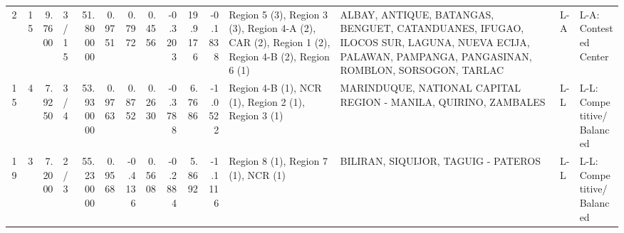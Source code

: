 \begin{tabular}{rrrlrrrrrrrllll}
2 & 15 & {\cellcolor[HTML]{455CCE}} \color[HTML]{F1F1F1} 9.7600 & 3/15 & {\cellcolor[HTML]{8FB1FE}} \color[HTML]{000000} 51.800000 & 0.9751 & 0.7972 & 0.4556 & -0.3203 & 19.9176 & -0.1838 & Region 5 (3), Region 3 (3), Region 4-A (2), CAR (2), Region 1 (2), Region 4-B (2), Region 6 (1) & ALBAY, ANTIQUE, BATANGAS, BENGUET, CATANDUANES, IFUGAO, ILOCOS SUR, LAGUNA, NUEVA ECIJA, PALAWAN, PAMPANGA, PANGASINAN, ROMBLON, SORSOGON, TARLAC & L-A & L-A: Contested Center \\
15 & 4 & {\cellcolor[HTML]{3D50C3}} \color[HTML]{F1F1F1} 7.9250 & 3/4 & {\cellcolor[HTML]{ADC9FD}} \color[HTML]{000000} 53.930000 & 0.9763 & 0.8752 & 0.2630 & -0.3788 & 6.7686 & -1.0522 & Region 4-B (1), NCR (1), Region 2 (1), Region 3 (1) & MARINDUQUE, NATIONAL CAPITAL REGION - MANILA, QUIRINO, ZAMBALES & L-L & L-L: Competitive/Balanced \\
19 & 3 & {\cellcolor[HTML]{3B4CC0}} \color[HTML]{F1F1F1} 7.2000 & 2/3 & {\cellcolor[HTML]{BED2F6}} \color[HTML]{000000} 55.230000 & 0.9568 & -0.4136 & 0.5608 & -0.2884 & 5.8692 & -1.1116 & Region 8 (1), Region 7 (1), NCR (1) & BILIRAN, SIQUIJOR, TAGUIG - PATEROS & L-L & L-L: Competitive/Balanced \\
\bottomrule
\end{tabular}

